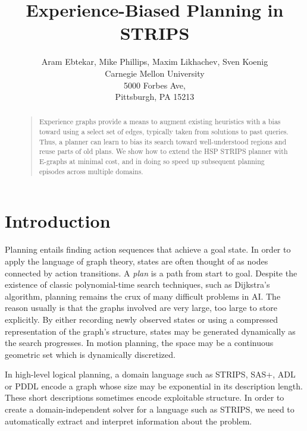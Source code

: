 \documentclass[letterpaper]{article}
\begin{document}
%
\title{Experience-Biased Planning in STRIPS}
\author{Aram Ebtekar, Mike Phillips, Maxim Likhachev, Sven Koenig\\
Carnegie Mellon University\\
5000 Forbes Ave,\\
Pittsburgh, PA 15213\\
}
\maketitle
\begin{abstract}
\begin{quote}
Experience graphs provide a means to augment existing heuristics with a bias toward using a select set of edges, typically taken from solutions to past queries. Thus, a planner can learn to bias its search toward well-understood regions and reuse parts of old plans. We show how to extend the HSP STRIPS planner with E-graphs at minimal cost, and in doing so speed up subsequent planning episodes across multiple domains.
\end{quote}
\end{abstract}

\section{Introduction}
Planning entails finding action sequences that achieve a goal state.
In order to apply the language of graph theory, states are often thought of as nodes connected by action transitions.
A \textit{plan} is a path from start to goal.
Despite the existence of classic polynomial-time search techniques, such as Dijkstra's algorithm, planning remains the crux of many difficult problems in AI.
The reason usually is that the graphs involved are very large, too large to store explicitly.
By either recording newly observed states or using a compressed representation of the graph's structure, states may be generated dynamically as the search progresses.
In motion planning, the space may be a continuous geometric set which is dynamically discretized.

In high-level logical planning, a domain language such as STRIPS, SAS+, ADL or PDDL encode a graph whose size may be exponential in its description length. 
These short descriptions sometimes encode exploitable structure.
In order to create a domain-independent solver for a language such as STRIPS, we need to automatically extract and interpret information about the problem. 
\end{document}
